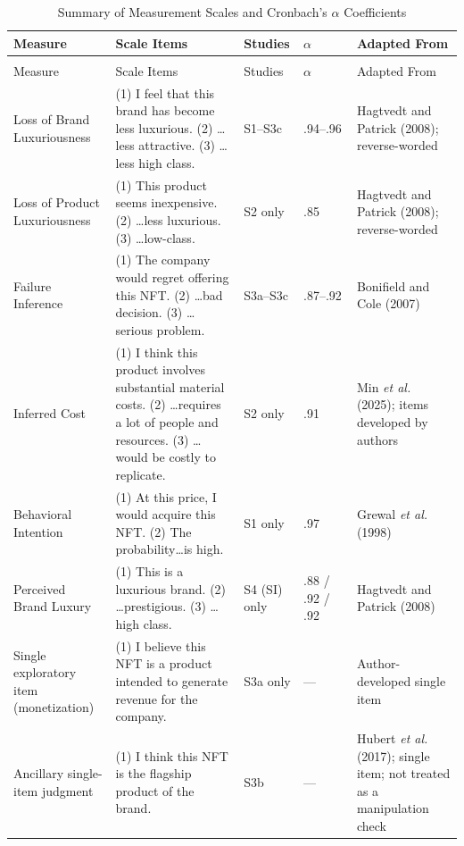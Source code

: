 \documentclass[12pt, a4paper]{article}
\begin{document}
\begin{singlespace}
\begin{longtable}[]{@{}
  >{\raggedright\arraybackslash}p{}
  >{\raggedright\arraybackslash}p{}
  >{\raggedright\arraybackslash}p{}
  >{\raggedright\arraybackslash}p{}
  >{\raggedright\arraybackslash}p{}@{}}
\caption{Summary of Measurement Scales and Cronbach's $\alpha$ Coefficients}\\
\toprule
Measure & Scale Items & Studies & $\alpha$ & Adapted From \\
\midrule
\endfirsthead
\multicolumn{5}{l}{\emph{Table A.1 (continued)}}\\
\toprule
Measure & Scale Items & Studies & $\alpha$ & Adapted From \\
\midrule
\endhead
\bottomrule
\endlastfoot
Loss of Brand Luxuriousness & (1) I feel that this brand has become less luxurious. (2) \ldots less attractive. (3) \ldots less high class. & S1--S3c & .94--.96 & Hagtvedt and Patrick (2008); reverse-worded \\
Loss of Product Luxuriousness & (1) This product seems inexpensive. (2) \ldots less luxurious. (3) \ldots low-class. & S2 only & .85 & Hagtvedt and Patrick (2008); reverse-worded \\
Failure Inference & (1) The company would regret offering this NFT. (2) \ldots bad decision. (3) \ldots serious problem. & S3a--S3c & .87--.92 & Bonifield and Cole (2007) \\
Inferred Cost & (1) I think this product involves substantial material costs. (2) \ldots requires a lot of people and resources. (3) \ldots would be costly to replicate. & S2 only & .91 & Min \emph{et al.} (2025); items developed by authors \\
Behavioral Intention & (1) At this price, I would acquire this NFT. (2) The probability\ldots is high. & S1 only & .97 & Grewal \emph{et al.} (1998) \\
Perceived Brand Luxury & (1) This is a luxurious brand. (2) \ldots prestigious. (3) \ldots high class. & S4 (SI) only & .88 / .92 / .92 & Hagtvedt and Patrick (2008) \\
Single exploratory item (monetization) & (1) I believe this NFT is a product intended to generate revenue for the company. & S3a only & --- & Author-developed single item \\
Ancillary single-item judgment & (1) I think this NFT is the flagship product of the brand. & S3b & --- & Hubert \emph{et al.} (2017); single item; not treated as a manipulation check \\
\end{longtable}
\end{singlespace}
\end{document}
